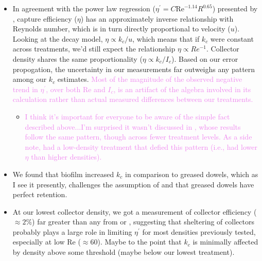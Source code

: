 \documentclass{article}
\newcommand\Rey{\mathrm{Re}}
\begin{document}
\begin{itemize}
    \item In agreement with the power law regression ($\eta^\prime = C\Rey^{-1.14}R^{0.65}$) presented by \cite{Fauria_2015}, capture efficiency ($\eta$) has an approximately inverse relationship with Reynolds number, which is in turn directly proportional to velocity ($u$). Looking at the decay model, $\eta \propto k_c/u$, which means that if $k_c$ were constant across treatments, we'd still expect the relationship $\eta \propto Re^{-1}$. Collector density shares the same proportionality ($\eta \propto k_c/I_c$). Based on our error propogation, the uncertainty in our measurements far outweighs any pattern among our $k_c$ estimates. \textcolor{violet}{Most of the magnitude of the observed negative trend in $\eta^\prime$, over both $\Rey$ and $I_c$, is an artifact of the algebra involved in its calculation rather than actual measured differences between our treatments.} 
        \begin{itemize}
            \item  \textcolor{violet}{I think it's important for everyone to be aware of the simple fact described above...I'm surprised it wasn't discussed in \cite{Fauria_2015}, whose results follow the same pattern, though across fewer treatment levels. As a side note, \cite{Purich_2007} had a low-density treatment that defied this pattern (i.e., had lower $\eta$ than higher densities).} 
        \end{itemize}
    \item We found that biofilm increased $k_c$ in comparison to greased dowels, which as I see it presently, challenges the assumption of \cite{Palmer_2004} and \cite{Fauria_2015} that greased dowels have perfect retention.
    \item At our lowest collector density, we got a measurement of collector efficiency ($\approx2\%$) far greater than any from \cite{Fauria_2015} or \cite{Purich_2007}, suggesting that sheltering of collectors probably plays a large role in limiting $\eta^\prime$ for most densities previously tested, especially at low Re ($\approx60$). Maybe to the point that $k_c$ is minimally affected by density above some threshold (maybe below our lowest treatment).
\end{itemize}



\end{document}
